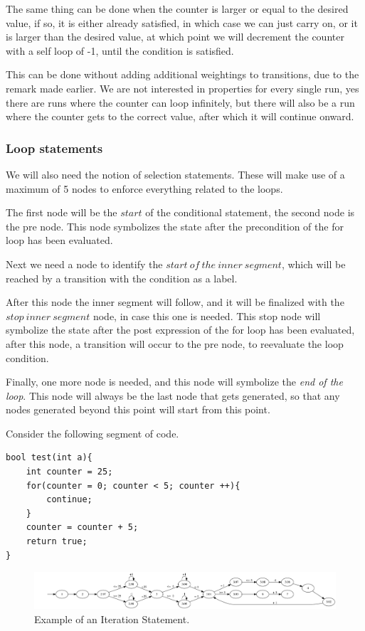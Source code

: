\documentclass[12pt]{article}
\begin{document}
The same thing can be done when the counter is larger or equal to the desired value, if so, it is either already satisfied, in which case we can just carry on, or it is larger than the desired value, at which point we will decrement the counter with a self loop of -1, until the condition is satisfied.

This can be done without adding additional weightings to transitions, due to the remark made earlier. We are not interested in properties for every single run, yes there are runs where the counter can loop infinitely, but there will also be a run where the counter gets to the correct value, after which it will continue onward.

\subsubsection{Loop statements}
We will also need the notion of selection statements. These will make use of a maximum of 5 nodes to enforce everything related to the loops. 

The first node will be the $start$ of the conditional statement, the second node is the pre node. This node symbolizes the state after the precondition of the for loop has been evaluated. 

Next we need a node to identify the $start\ of\ the\ inner\ segment$, which will be reached by a transition with the condition as a label. 

After this node the inner segment will follow, and it will be finalized with the $stop\ inner\ segment$ node, in case this one is needed. This stop node will symbolize the state after the post expression of the for loop has been evaluated, after this node, a transition will occur to the pre node, to reevaluate the loop condition.

Finally, one more node is needed, and this node will symbolize the \textit{end of the loop}. This node will always be the last node that gets generated, so that any nodes generated beyond this point will start from this point.

Consider the following segment of code.
\begin{lstlisting}[style=CStyle]
bool test(int a){
	int counter = 25;
	for(counter = 0; counter < 5; counter ++){
		continue;
	}
	counter = counter + 5;
	return true;
}
\end{lstlisting}

\begin{figure}[h]
	\centering
	\includegraphics[width=\linewidth]{test_counter_automaton}
	\caption{Example of an Iteration Statement.}
	\label{fig:test_counter_automaton}
\end{figure}
\end{document}
